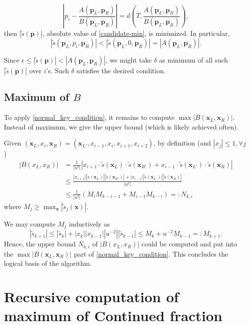 \documentclass{article}
\theoremstyle{definition}
\theoremstyle{plain}
\theoremstyle{remark}
\numberwithin{equation}{section}
\newcommand{\abs}[1]{\left\lvert{#1}\right\rvert}
\begin{document}
\[
  \abs{p_i - \frac{A(\mathbf{p}_L, \mathbf{p}_R)}{B(\mathbf{p}_L, \mathbf{p}_R)}}
  = d \left( \bar{T}, \frac{A(\mathbf{p}_L, \mathbf{p}_R)}{B(\mathbf{p}_L, \mathbf{p}_R)} \right),
\]
then $\abs{\tilde{s}(\mathbf{p})}$, absolute value of \eqref{candidate-min}, is minimized.
In particular,
\[
  \abs{\tilde{s}(\mathbf{p}_L, p_i, \mathbf{p}_R)}
  < \abs{\tilde{s}(\mathbf{p}_L, 0, \mathbf{p}_R)} = \abs{A(\mathbf{p}_L, \mathbf{p}_R)}.
\]

Since $\epsilon \leq \abs{\tilde{s}(\mathbf{p})} < \abs{A(\mathbf{p}_L, \mathbf{p}_R)}$,
we might take $\delta$ as minimum of all such $\abs{\tilde{s}(\mathbf{p})}$ over $i$'s.
Such $\delta$ satisfies the desired condition.

\subsection{Maximum of $B$}

To apply \eqref{normal_key_condition},
it remains to compute $\max \abs{B(\mathbf{x}_L, \mathbf{x}_R)}$.
Instead of maximum, we give the upper bound (which is likely achieved often).

Given $(\mathbf{x}_L, x_i, \mathbf{x}_R) = (\mathbf{x}_{L'}, x_{i-1}, x_i, x_{i+1}, x_{i+2})$,
by definition (and $\abs{x_j} \leq 1, \forall j$)
\begin{align*}
  \abs{B(x_L, x_R)}
  & = \frac{1}{\abs{u^2}}
  \abs{x_{i+1} \cdot \tilde{s}(\mathbf{x}_L) \cdot \tilde{s}(\mathbf{x}_{R'})
  + x_{i-1} \cdot \tilde{s}(\mathbf{x}_{L'}) \cdot \tilde{s}(\mathbf{x}_R)} \\
  & \leq \frac{\abs{x_{i+1}} \abs{\tilde{s}(\mathbf{x}_L)} \abs{\tilde{s}(\mathbf{x}_{R'})}
  + \abs{x_{i-1}} \abs{\tilde{s}(\mathbf{x}_{L'})} \abs{\tilde{s}(\mathbf{x}_R)}}{\abs{u^2}} \\
  & \leq \frac{1}{\abs{u^2}} (M_i M_{k-i-1} + M_{i-1} M_{k-i}) =: N_{k, i}
\end{align*}
where $M_j \geq \max_{\mathbf{x}} \abs{\tilde{s}_j(\mathbf{x})}$.

We may compute $M_j$ inductively as
\[
  \abs{\tilde{s}_{k+1}}
  \leq \abs{\tilde{s}_k} + \abs{x_k} \abs{x_{k-1}} \abs{u^{-2}} \abs{\tilde{s}_{k-1}}
  \leq M_k + u^{-2} M_{k-1} =: M_{k+1}.
\]
Hence, the upper bound $N_{k, i}$ of $\abs{B(x_L, x_R)}$ could be computed
and put into the $\max \abs{B(\mathbf{x}_L, \mathbf{x}_R)}$ part of \eqref{normal_key_condition}.
This concludes the logical basis of the algorithm.

\section{Recursive computation of maximum of Continued fraction}
\end{document}
